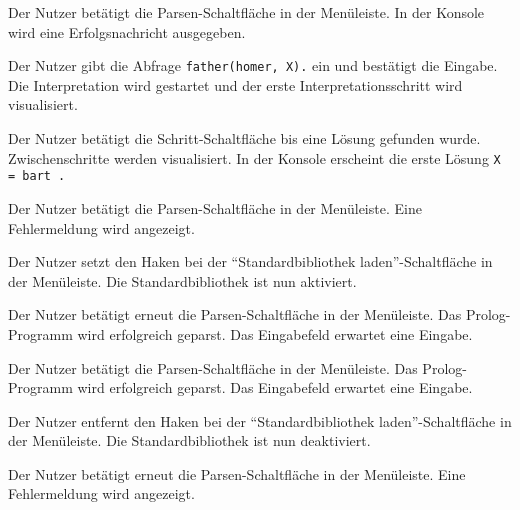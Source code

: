 \documentclass[parskip=full,11pt,twoside]{scrartcl}
\begin{document}
{Der Nutzer betätigt die Parsen-Schaltfläche in der Menüleiste.}
{In der Konsole wird eine Erfolgsnachricht ausgegeben.}

{Der Nutzer gibt die Abfrage \texttt{father(homer, X).} ein und bestätigt die Eingabe.}
{Die Interpretation wird gestartet und der erste Interpretationsschritt wird visualisiert.}

{Der Nutzer betätigt die Schritt-Schaltfläche bis eine Lösung gefunden wurde.}
{Zwischenschritte werden visualisiert. In der Konsole erscheint die erste Lösung \texttt{X = bart .}}


{Der Nutzer betätigt die Parsen-Schaltfläche in der Menüleiste.}
{Eine Fehlermeldung wird angezeigt.}

{Der Nutzer setzt den Haken bei der \enquote{Standardbibliothek laden}-Schaltfläche in der Menüleiste.}
{Die Standardbibliothek ist nun aktiviert.}

{Der Nutzer betätigt erneut die Parsen-Schaltfläche in der Menüleiste.}
{Das Prolog-Programm wird erfolgreich geparst. Das Eingabefeld erwartet eine Eingabe.}


{Der Nutzer betätigt die Parsen-Schaltfläche in der Menüleiste.}
{Das Prolog-Programm wird erfolgreich geparst. Das Eingabefeld erwartet eine Eingabe.}

{Der Nutzer entfernt den Haken bei der \enquote{Standardbibliothek laden}-Schaltfläche in der Menüleiste.}
{Die Standardbibliothek ist nun deaktiviert.}

{Der Nutzer betätigt erneut die Parsen-Schaltfläche in der Menüleiste.}
{Eine Fehlermeldung wird angezeigt.}
\end{document}
